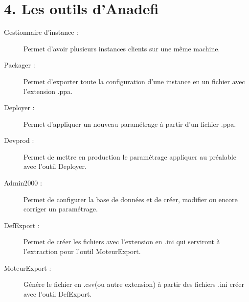 \section*{4. Les outils d'Anadefi}

\begin{description}
    \item[Gestionnaire d'instance :] Permet d'avoir plusieurs instances clients sur une même machine. 
    \item[Packager :] Permet d'exporter toute la configuration d'une instance en un fichier avec l'extension .ppa.
    \item[Deployer :] Permet d'appliquer un nouveau paramétrage à partir d'un fichier .ppa.
    \item[Devprod :] Permet de mettre en production le paramétrage appliquer au préalable avec l'outil Deployer.
    \item [Admin2000 :] Permet de configurer la base de données et de créer, modifier ou encore corriger un paramétrage. 
    \item[DefExport :] Permet de créer les fichiers avec l'extension en .ini qui serviront à l'extraction pour l'outil MoteurExport.
    \item[MoteurExport :] Génére le fichier en .csv(ou autre extension) à partir des fichiers .ini créer avec l'outil DefExport.
\end{description}